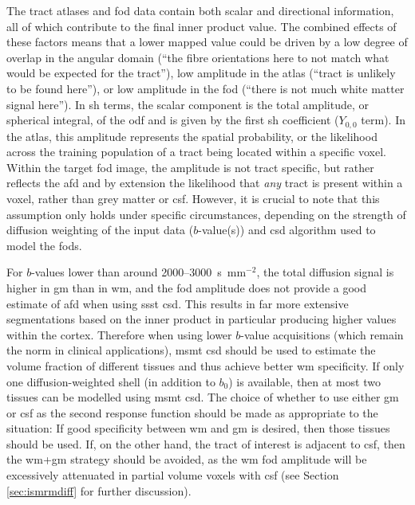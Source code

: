 \documentclass[12pt,phd,a4paper,twoside]{ucl_thesis}
\begin{document}
The tract atlases and \gls{fod} data contain both scalar and directional information, all of which contribute to the final inner product value.
The combined effects of these factors means that a lower mapped value could be driven by a low degree of overlap in the angular domain (``the fibre orientations here to not match what would be expected for the tract''), low amplitude in the atlas (``tract is unlikely to be found here''), or low amplitude in the \gls{fod} (``there is not much white matter signal here'').
In \gls{sh} terms, the scalar component is the total amplitude, or spherical integral, of the \gls{odf} and is given by the first \gls{sh} coefficient ($Y_{0,0}$ term).
In the atlas, this amplitude represents the spatial probability, or the likelihood across the training population of a tract being located within a specific voxel.
Within the target \gls{fod} image, the amplitude is not tract specific, but rather reflects the \gls{afd} and by extension the likelihood that \textit{any} tract is present within a voxel, rather than grey matter or \gls{csf}.
However, it is crucial to note that this assumption only holds under specific circumstances, depending on the strength of diffusion weighting of the input data ($b$-value(s)) and \gls{csd} algorithm used to model the \glspl{fod}.

For $b$-values lower than around 2000--3000~s~mm$^{-2}$, the total diffusion signal is higher in \gls{gm} than in \gls{wm}, and the \gls{fod} amplitude does not provide a good estimate of \gls{afd} when using \gls{ssst} \gls{csd}.
This results in far more extensive segmentations based on the inner product in particular producing higher values within the cortex.
Therefore when using lower $b$-value acquisitions (which remain the norm in clinical applications), \gls{msmt} \gls{csd} should be used to estimate the volume fraction of different tissues and thus achieve better \gls{wm} specificity.
If only one diffusion-weighted shell (in addition to $b_0$) is available, then at most two tissues can be modelled using \gls{msmt} \gls{csd}.
The choice of whether to use either \gls{gm} or \gls{csf} as the second response function should be made as appropriate to the situation: If good specificity between \gls{wm} and \gls{gm} is desired, then those tissues should be used.
If, on the other hand, the tract of interest is adjacent to \gls{csf}, then the \gls{wm}+\gls{gm} strategy should be avoided, as the \gls{wm} \gls{fod} amplitude will be excessively attenuated in partial volume voxels with \gls{csf} (see Section \ref{sec:ismrmdiff} for further discussion).
\end{document}
